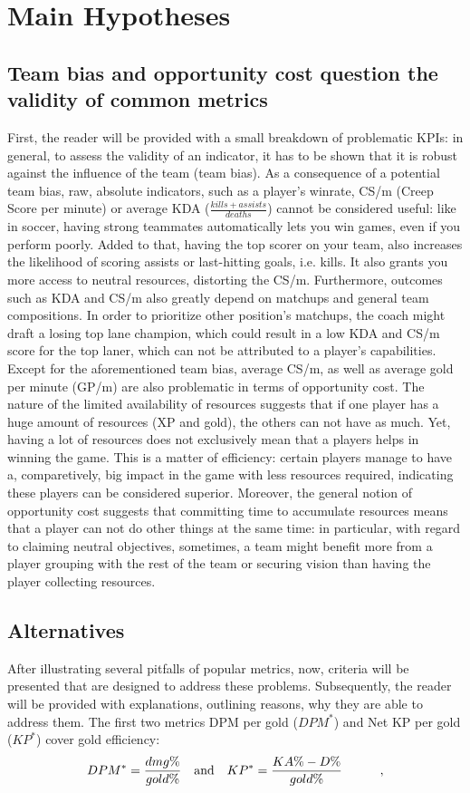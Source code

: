 \documentclass{article}
\begin{document}
\section{Main Hypotheses}
\subsection{Team bias and opportunity cost question the validity of common metrics}
First, the reader will be provided with a small breakdown of problematic KPIs: 
in general, to assess the validity of an indicator, it has to be shown that it is robust against the influence of the team (team bias).
As a consequence of a potential team bias, raw, absolute indicators, such as a player's winrate, CS/m (Creep Score per minute) or average KDA ($\frac{kills + assists}{deaths}$) cannot be considered useful: like in soccer, having strong teammates automatically lets you win games, even if you perform poorly. Added to that, having the top scorer on your team, also increases the likelihood of scoring assists or last-hitting goals, i.e. kills. It also grants you more access to neutral resources, distorting the CS/m. Furthermore, outcomes such as KDA and CS/m also greatly depend on matchups and general team compositions. In order to prioritize other position's matchups, the coach might draft a losing top lane champion, which could result in a low KDA and CS/m score for the top laner, which can not be attributed to a player's capabilities. \newline
Except for the aforementioned team bias, average CS/m, as well as average gold per minute (GP/m) are also problematic in terms of opportunity cost. The nature of the limited availability of resources suggests that if one player has a huge amount of resources (XP and gold), the others can not have as much. Yet, having a lot of resources does not exclusively mean that a players helps in winning the game.  This is a matter of efficiency: certain players manage to have a, comparetively, big impact in the game with less resources required, indicating these players can be considered superior. Moreover, the general notion of opportunity cost suggests that committing time to accumulate resources means that a player can not do other things at the same time: in particular, with regard to claiming neutral objectives, sometimes, a team might benefit more from a player grouping with the rest of the team or securing vision than having the player collecting resources. 


\subsection{Alternatives}
After illustrating several pitfalls of popular metrics, now, criteria will be presented that are designed to address these problems. Subsequently, the reader will be provided with explanations, outlining reasons, why they are able to address them. \newline The first two metrics DPM per gold ($DPM^*$) and Net KP per gold ($KP^*$) cover gold efficiency:
\begin{equation}
DPM^* = \frac{dmg \%}{gold \%} \quad\mathrm{and}\quad 
KP^* =  \frac{KA \% - D \%}{gold \%} \indent \indent ,
\end{equation}
\end{document}
